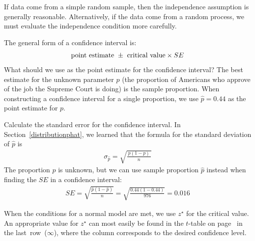 \begin{tipBox}{
If data come from a simple random sample, then the independence assumption is generally reasonable. Alternatively, if the data come from a random process, we must evaluate the independence condition more carefully.}
\end{tipBox}

\begin{example}{The general form of a confidence interval is:
\begin{align*}
\text{point estimate}\ \pm\ \text{critical value} \times SE\vspace{-2mm}
\end{align*}
What should we use as the point estimate for the confidence interval?}
\label{supremeCourtCISEExample}
The best estimate for the unknown parameter $p$ (the proportion of Americans who approve of the job the Supreme Court is doing) is the sample proportion. When constructing a confidence interval for a single proportion, we use $\hat{p} = 0.44$ as the point estimate for $p$.
\end{example}

\textA{\newpage}

\begin{example}{Calculate the standard error for the confidence interval.}
\label{supremeCourtCIFinishedExample}
In Section~\ref{distributionphat}, we learned that the formula for the standard deviation of $\hat{p}$ is
\begin{align*}
\sigma_{\hat{p}} = \sqrt{\frac{\ p(1-p)\ }{n}}
\end{align*}
The proportion $p$ is unknown, but we can use sample proportion $\hat{p}$ instead when finding the $SE$ in a confidence interval:
\begin{align*}
SE = \sqrt{\frac{\hat{p}(1-\hat{p})}{n}}= \sqrt{\frac{0.44(1-0.44)}{976}}= 0.016
\end{align*}
\end{example}

When the conditions for a normal model are met, we use $z^{\star}$ for the critical value. An appropriate value for $z^{\star}$ can most easily be found in the $t$-table on page~\pageref{tDistributionTable} in the last~row~($\infty$), where the column corresponds to the desired confidence level.

